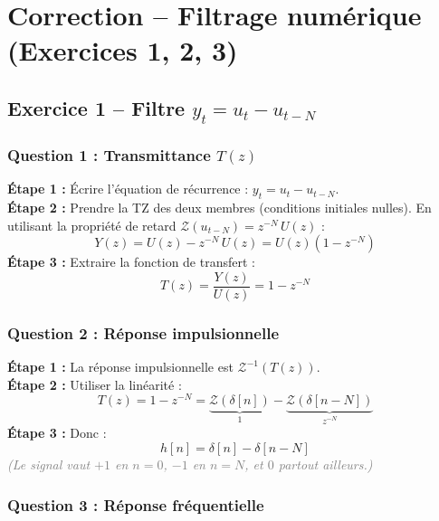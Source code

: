 \documentclass[12pt,a4paper]{article}
\newcommand{\TZ}{\mathcal{Z}}
\newcommand{\step}[1]{\textcolor{coursbleu}{\textbf{Étape #1 :}}}
\newcommand{\explication}[1]{\textit{\textcolor{gray}{(#1)}}}
\newcommand{\encadre}[1]{\boxed{#1}}
\begin{document}
\newpage
\section{Correction -- Filtrage numérique (Exercices 1, 2, 3)}

\subsection{Exercice 1 -- Filtre
  \texorpdfstring{$y_t = u_t - u_{t-N}$}{yt = ut - u(t-N)}}

\subsubsection*{Question 1 : Transmittance $T(z)$}

\begin{tcolorbox}[corrbox, title=Correction Q1]
\step{1} Écrire l'équation de récurrence : $y_t = u_t - u_{t-N}$.\\[4pt]
\step{2} Prendre la TZ des deux membres (conditions initiales nulles). En utilisant
la propriété de retard $\TZ(u_{t-N}) = z^{-N}\,U(z)$ :
\[
  Y(z) = U(z) - z^{-N}\,U(z) = U(z)\left(1 - z^{-N}\right)
\]
\step{3} Extraire la fonction de transfert :
\[
  \encadre{T(z) = \frac{Y(z)}{U(z)} = 1 - z^{-N}}
\]
\end{tcolorbox}

\subsubsection*{Question 2 : Réponse impulsionnelle}

\begin{tcolorbox}[corrbox, title=Correction Q2]
\step{1} La réponse impulsionnelle est $\TZ^{-1}(T(z))$.\\[4pt]
\step{2} Utiliser la linéarité :
\[
  T(z) = 1 - z^{-N}
       = \underbrace{\TZ(\delta[n])}_{1} - \underbrace{\TZ(\delta[n-N])}_{z^{-N}}
\]
\step{3} Donc :
\[
  \encadre{h[n] = \delta[n] - \delta[n-N]}
\]
\explication{Le signal vaut $+1$ en $n=0$, $-1$ en $n=N$, et $0$ partout ailleurs.}
\end{tcolorbox}

\subsubsection*{Question 3 : Réponse fréquentielle}
\end{document}
